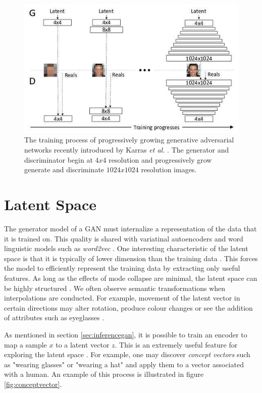 \documentclass[11pt]{article}
\begin{document}
\begin{figure}
\centering
\includegraphics[scale=0.45]{progressive_growing}
\caption{The training process of progressively growing generative adversarial networks recently introduced by Karras \textit{et al.} \citep{2017arXiv171010196K}. The generator and discriminator begin at $4x4$ resolution and progressively grow generate and discriminate $1024x1024$ resolution images.}
\label{fig:ProgressiveGrowingGAN}
\end{figure}



\section{Latent Space} \label{sed:latentspace}
The generator model of a GAN must internalize a representation of the data that it is trained on. This quality is shared with variatinal autoencoders and word linguistic models such as \textit{word2vec} \citep{2017arXiv171007035C}. One interesting characteristic of the latent space is that it is typically of lower dimension than the training data \citep{2017arXiv171007035C}. This forces the model to efficiently represent the training data by extracting only useful features. As long as the effects of mode collapse are minimal, the latent space can be highly structured \citep{2017arXiv171007035C}. We often observe semantic transformations when interpolations are conducted. For example, movement of the latent vector in certain directions may alter rotation, produce colour changes or see the addition of attributes such as eyeglasses \citep{2017arXiv171007035C}.

As mentioned in section \ref{sec:inferencegan}, it is possible to train an encoder to map a sample $x$ to a latent vector $z$. This is an extremely useful feature for exploring the latent space \citep{2017arXiv171007035C}. For example, one may discover \textit{concept vectors} such as "wearing glasses" or "wearing a hat" and apply them to a vector associated with a human. An example of this process is illustrated in figure \ref{fig:conceptvector}.
\end{document}
